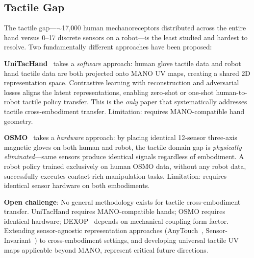 \subsection{Tactile Gap}

The tactile gap---$\sim$17{,}000 human mechanoreceptors distributed across the entire hand versus 0--17 discrete sensors on a robot---is the least studied and hardest to resolve. Two fundamentally different approaches have been proposed:

\textbf{UniTacHand}~\cite{zhang2025unitachand} takes a \emph{software} approach: human glove tactile data and robot hand tactile data are both projected onto MANO UV maps, creating a shared 2D representation space. Contrastive learning with reconstruction and adversarial losses aligns the latent representations, enabling zero-shot or one-shot human-to-robot tactile policy transfer. This is the \emph{only} paper that systematically addresses tactile cross-embodiment transfer. Limitation: requires MANO-compatible hand geometry.

\textbf{OSMO}~\cite{yin2025osmo} takes a \emph{hardware} approach: by placing identical 12-sensor three-axis magnetic gloves on both human and robot, the tactile domain gap is \emph{physically eliminated}---same sensors produce identical signals regardless of embodiment. A robot policy trained exclusively on human OSMO data, without any robot data, successfully executes contact-rich manipulation tasks. Limitation: requires identical sensor hardware on both embodiments.

\textbf{Open challenge}: No general methodology exists for tactile cross-embodiment transfer. UniTacHand requires MANO-compatible hands; OSMO requires identical hardware; DEXOP~\cite{fang2025dexop} depends on mechanical coupling form factor. Extending sensor-agnostic representation approaches (AnyTouch~\cite{feng2025anytouch}, Sensor-Invariant~\cite{various2025sensorinvariant}) to cross-embodiment settings, and developing universal tactile UV maps applicable beyond MANO, represent critical future directions.
